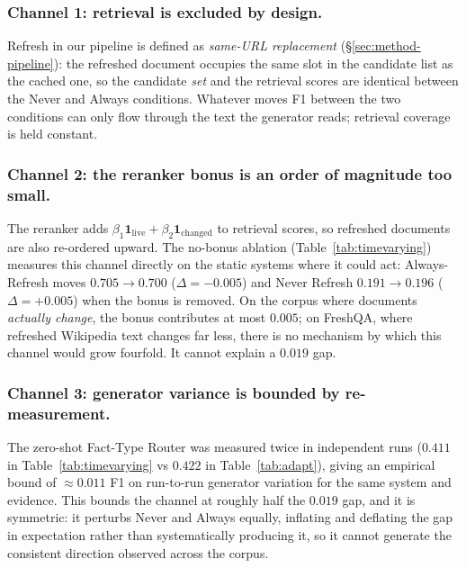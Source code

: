\documentclass[pdflatex,sn-basic]{sn-jnl}
\providecommand{\mathbbm}[1]{\mathbf{#1}}
\begin{document}
\subsubsection*{Channel 1: retrieval is excluded by design.}
Refresh in our pipeline is defined as \emph{same-URL replacement} (§\ref{sec:method-pipeline}): the refreshed document occupies the same slot in the candidate list as the cached one, so the candidate \emph{set} and the retrieval scores are identical between the Never and Always conditions. Whatever moves F1 between the two conditions can only flow through the text the generator reads; retrieval coverage is held constant.

\subsubsection*{Channel 2: the reranker bonus is an order of magnitude too small.}
The reranker adds $\beta_1\mathbbm{1}_{\text{live}} + \beta_2\mathbbm{1}_{\text{changed}}$ to retrieval scores, so refreshed documents are also re-ordered upward. The no-bonus ablation (Table~\ref{tab:timevarying}) measures this channel directly on the static systems where it could act: Always-Refresh moves $0.705 \to 0.700$ ($\Delta{=}{-}0.005$) and Never Refresh $0.191 \to 0.196$ ($\Delta{=}{+}0.005$) when the bonus is removed. On the corpus where documents \emph{actually change}, the bonus contributes at most $0.005$; on FreshQA, where refreshed Wikipedia text changes far less, there is no mechanism by which this channel would grow fourfold. It cannot explain a $0.019$ gap.

\subsubsection*{Channel 3: generator variance is bounded by re-measurement.}
The zero-shot Fact-Type Router was measured twice in independent runs ($0.411$ in Table~\ref{tab:timevarying} vs $0.422$ in Table~\ref{tab:adapt}), giving an empirical bound of $\approx 0.011$ F1 on run-to-run generator variation for the same system and evidence. This bounds the channel at roughly half the $0.019$ gap, and it is symmetric: it perturbs Never and Always equally, inflating and deflating the gap in expectation rather than systematically producing it, so it cannot generate the consistent direction observed across the corpus.
\end{document}
